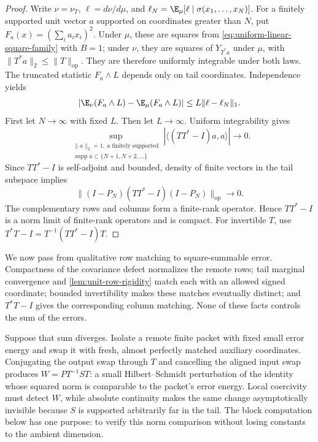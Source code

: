 \begin{proof}
Write $\nu=\nu_T$, $\ell=d\nu/d\mu$, and
$\ell_N=\E_\mu[\ell\mid\sigma(x_1,\ldots,x_N)]$.
For a finitely supported unit vector $a$ supported on coordinates greater than
$N$, put
$F_a(x)=(\sum_i a_ix_i)^2$.  Under $\mu$, these are squares from
\eqref{eq:uniform-linear-square-family} with $B=1$; under $\nu$,
they are squares of $Y_{T^*a}$ under $\mu$, with
$\|T^*a\|_2\leq\|T\|_{\mathrm{op}}$.  They are therefore uniformly integrable
under both laws.  The truncated statistic $F_a\wedge L$ depends only
on tail coordinates.  Independence yields
\[
 \left|\E_\nu(F_a\wedge L)-\E_\mu(F_a\wedge L)\right|
 \leq L\|\ell-\ell_N\|_1.
\]
First let $N\to\infty$ with fixed $L$.
Then let $L\to\infty$.
Uniform integrability gives
\[
 \sup_{\substack{\|a\|_2=1,\ a\text{ finitely supported}\\
                  \operatorname{supp}a\subset\{N+1,N+2,\ldots\}}}
 \left|\langle(TT^*-I)a,a\rangle\right|\longrightarrow0.
\]
Since $TT^*-I$ is self-adjoint and bounded, density of finite vectors
in the tail subspace implies
\[
 \|(I-P_N)(TT^*-I)(I-P_N)\|_{\mathrm{op}}\longrightarrow0.
\]
The complementary rows and columns form a finite-rank operator.  Hence
$TT^*-I$ is a norm limit of finite-rank operators and is compact.
For invertible $T$, use
$T^*T-I=T^{-1}(TT^*-I)T$.
\end{proof}

We now pass from qualitative row matching to square-summable error.  Compactness
of the covariance defect normalizes the remote rows; tail marginal convergence and
\cref{lem:unit-row-rigidity} match each with an allowed signed coordinate;
bounded invertibility makes these matches eventually distinct; and
\(T^*T-I\) gives the corresponding column matching.  None of these facts
controls the sum of the errors.

Suppose that sum diverges.  Isolate a remote finite packet with fixed small
error energy and swap it with fresh, almost perfectly matched auxiliary
coordinates.  Conjugating the output swap through \(T\) and cancelling the
aligned input swap produces \(W=PT^{-1}ST\): a small Hilbert--Schmidt
perturbation of the identity whose squared norm is comparable to the packet's
error energy.
Local coercivity must detect \(W\), while absolute continuity makes the same
change asymptotically invisible because \(S\) is supported arbitrarily far in
the tail.  The block computation below has one purpose: to verify this norm
comparison without losing constants to the ambient dimension.

